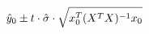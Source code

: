 \documentclass[preview]{standalone}
\begin{document}
\begin{align*}
\special{dvisvgm:raw <g id='unique000'>}\hat{y}_0 \pm t \cdot \hat{\sigma} \cdot \sqrt{x_0^T (X^T X)^{-1} x_0}\special{dvisvgm:raw </g>}
\end{align*}
\end{document}
